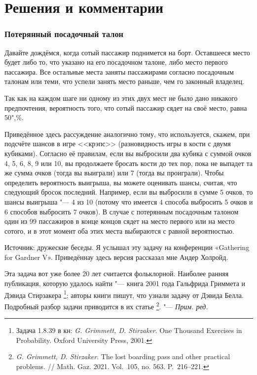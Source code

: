 \documentclass[twoside]{book}
\newenvironment{addedbytheeditors}{\par\medskip\small
}{\par\addvspace{\medskipamount}} %
\begin{document}

\section*{Решения и комментарии}

\subsubsection*{Потерянный посадочный талон}%

Давайте дождёмся, когда сотый пассажир поднимется на борт.
Оставшееся
место будет либо то, что указано на его посадочном талоне, либо место
первого пассажира.
Все остальные места заняты пассажирами согласно
посадочным талонам или теми, что успели занять место раньше, чем го
законный владелец.

Так как на каждом шаге ни одному из этих двух мест не было дано никакого предпочтения, вероятность того, что сотый пассажир сядет на своё место, равна 50",\%.
\heart

Приведённое здесь рассуждение аналогично тому, что используется,
скажем, при подсчёте шансов в игре <<крэпс>> (разновидность игры в
кости с двумя кубиками).
Согласно её правилам, если вы выбросили два
кубика с суммой очков 4, 5, 6, 8, 9 или 10, вы продолжаете бросать
кости до тех пор, пока не выпадет та же сумма очков (тогда вы
выиграли) или 7 (тогда вы проиграли).
Чтобы определить вероятность
выигрыша, вы можете оценивать шансы, считая, что следующий бросок
последний.
Например, если вы выбросили в сумме 5 очков, то шансы
выигрыша "--- 4 из 10 (потому что имеется 4 способа выбросить 5 очков
и 6 способов выбросить 7 очков).
В случае с потерянным посадочным
талоном один из 99 пассажиров в конце концов сядет на место первого
или на место сотого, и в этот момент оба этих места выбираются с
равной вероятностью.

\medskip

Источник: дружеские беседы.
Я услышал эту задачу на конференции «Gathering for Gardner V».
Приведённау здесь версия рассказал мне Андер Холройд. %

\begin{addedbytheeditors}
Эта задача вот уже более 20 лет считается фольклорной.
Наиболее ранняя публикация, которую удалось найти "--- книга 2001 года Гальфрида Гриммета и Дэвида Стирзакера%
\footnote{Задача 1.8.39 в кн: \emph{G. Grimmett, D. Stirzaker}. One Thousand Exercises in Probability. Oxford University Press, 2001.};
авторы книги пишут, что узнали задачу от Дэвида Белла.
Подробный разбор задачи приводится в их статье%
\footnote{\emph{G. Grimmett, D. Stirzaker}.
The lost boarding pass and other practical problems.
/\!/
Math. Gaz. 2021. Vol.~105, no. 563. P.~216--221.}.
"--- \emph{Прим. ред.}  
\end{addedbytheeditors}
\end{document}
